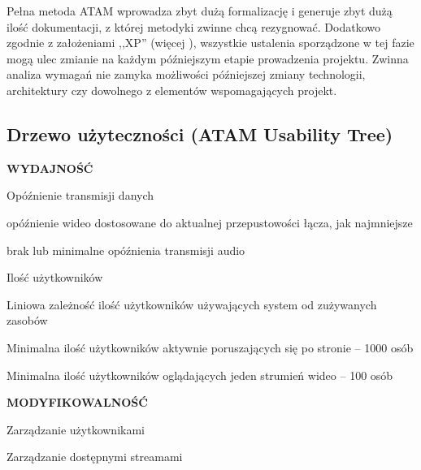 Pełna metoda ATAM wprowadza zbyt dużą formalizację i generuje zbyt dużą ilość dokumentacji, z której metodyki zwinne chcą rezygnować. Dodatkowo zgodnie z założeniami ,,XP'' (więcej ), wszystkie ustalenia sporządzone w tej fazie mogą ulec zmianie na każdym późniejszym etapie prowadzenia projektu. Zwinna analiza wymagań nie zamyka możliwości późniejszej zmiany technologii, architektury czy dowolnego z elementów wspomagających projekt.

\subsection{Drzewo użyteczności (ATAM Usability Tree)}
\label{sec:EtapIdrzewoUzytecznosci}

\begin{packed_item}
    \item{
        \textbf{WYDAJNOŚĆ}
        \begin{packed_item}
            \item{
                Opóźnienie transmisji danych
                \begin{packed_item}
                    \item{opóźnienie wideo dostosowane do aktualnej przepustowości łącza, jak najmniejsze}
                    \item{brak lub minimalne opóźnienia transmisji audio}
                \end{packed_item}
            }
            \item{
                Ilość użytkowników
                \begin{packed_item}
                    \item{Liniowa zależność ilość użytkowników używających system od zużywanych zasobów}
                    \item{Minimalna ilość użytkowników aktywnie poruszających się po stronie -- 1000 osób}
                    \item{Minimalna ilość użytkowników oglądających jeden strumień wideo -- 100 osób}
                \end{packed_item}
            }
        \end{packed_item}
    }
    \item{
        \textbf{MODYFIKOWALNOŚĆ}
        \begin{packed_item}
            \item{Zarządzanie użytkownikami}
            \item{Zarządzanie dostępnymi streamami}

\end{packed_item}}
\end{packed_item}
